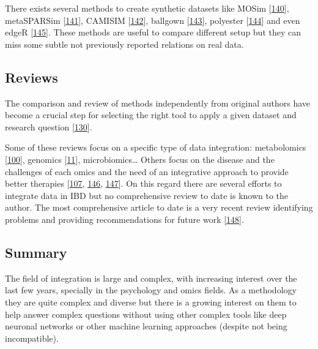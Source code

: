 \documentclass[
  12pt,
  a4paper,
  twoside,
  openright]{book}
\begin{document}
There exists several methods to create synthetic datasets like MOSim {[}\protect\hyperlink{ref-martuxednez-mira2018}{140}{]}, metaSPARSim {[}\protect\hyperlink{ref-patuzzi2019}{141}{]}, CAMISIM {[}\protect\hyperlink{ref-fritz2019}{142}{]}, ballgown {[}\protect\hyperlink{ref-fu2021}{143}{]}, polyester {[}\protect\hyperlink{ref-frazee2021}{144}{]} and even edgeR {[}\protect\hyperlink{ref-mccarthy2012}{145}{]}.
These methods are useful to compare different setup but they can miss some subtle not previously reported relations on real data.

\hypertarget{reviews}{%
\subsection{Reviews}\label{reviews}}

The comparison and review of methods independently from original authors have become a crucial step for selecting the right tool to apply a given dataset and research question {[}\protect\hyperlink{ref-cantini2021}{130}{]}.

Some of these reviews focus on a specific type of data integration: metabolomics {[}\protect\hyperlink{ref-cavill2016}{100}{]}, genomics {[}\protect\hyperlink{ref-mcgovern2015}{11}{]}, microbiomics\ldots{} Others focus on the disease and the challenges of each omics and the need of an integrative approach to provide better therapies {[}\protect\hyperlink{ref-tarazona2021}{107}, \protect\hyperlink{ref-de_souza_ibd_2017}{146}, \protect\hyperlink{ref-valles-colomer2016}{147}{]}.
On this regard there are several efforts to integrate data in IBD but no comprehensive review to date is known to the author.
The most comprehensive article to date is a very recent review identifying problems and providing recommendations for future work {[}\protect\hyperlink{ref-sudhakar2022}{148}{]}.

\hypertarget{methods-integration}{%
\subsection{Summary}\label{methods-integration}}

The field of integration is large and complex, with increasing interest over the last few years, specially in the psychology and omics fields.
As a methodology they are quite complex and diverse but there is a growing interest on them to help answer complex questions without using other complex tools like deep neuronal networks or other machine learning approaches (despite not being incompatible).
\end{document}
